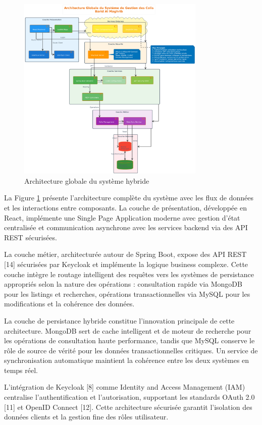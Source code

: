 \begin{figure}[H]
\centering
\includegraphics[width=0.8\textwidth]{images/architecture_globale.png}
\caption{Architecture globale du système hybride}
\label{fig:architecture_globale}
\end{figure}
La Figure \ref{fig:architecture_globale} présente l'architecture complète du système avec les flux de données et les interactions entre composants. La couche de présentation, développée en React, implémente une Single Page Application moderne avec gestion d'état centralisée et communication asynchrone avec les services backend via des API REST sécurisées.

La couche métier, architecturée autour de Spring Boot, expose des API REST [14] sécurisées par Keycloak et implémente la logique business complexe. Cette couche intègre le routage intelligent des requêtes vers les systèmes de persistance appropriés selon la nature des opérations : consultation rapide via MongoDB pour les listings et recherches, opérations transactionnelles via MySQL pour les modifications et la cohérence des données.

La couche de persistance hybride constitue l'innovation principale de cette architecture. MongoDB sert de cache intelligent et de moteur de recherche pour les opérations de consultation haute performance, tandis que MySQL conserve le rôle de source de vérité pour les données transactionnelles critiques. Un service de synchronisation automatique maintient la cohérence entre les deux systèmes en temps réel.

L'intégration de Keycloak [8] comme Identity and Access Management (IAM) centralise l'authentification et l'autorisation, supportant les standards OAuth 2.0 [11] et OpenID Connect [12]. Cette architecture sécurisée garantit l'isolation des données clients et la gestion fine des rôles utilisateur.

